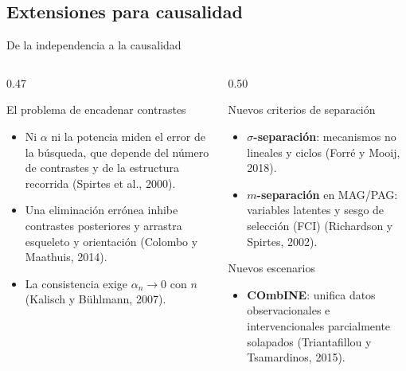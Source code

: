 \documentclass[aspectratio=169,11pt]{beamer}
\newcommand{\srccite}[1]{{\scriptsize\color{upmgray}(#1)}}
\begin{document}
\subsection{Extensiones para causalidad}

\begin{frame}[t]{De la independencia a la causalidad}
  \small
  \begin{columns}[T,onlytextwidth]
    \begin{column}{0.47\textwidth}
      \begin{block}{El problema de encadenar contrastes}
        \begin{itemize}
          \item Ni $\alpha$ ni la potencia miden el error de la búsqueda, que
                depende del número de contrastes y de la estructura recorrida
                \srccite{Spirtes et al., 2000}.
          \item Una eliminación errónea inhibe contrastes posteriores y
                arrastra esqueleto y orientación
                \srccite{Colombo y Maathuis, 2014}.
          \item La consistencia exige $\alpha_n\to 0$ con $n$
                \srccite{Kalisch y Bühlmann, 2007}.
        \end{itemize}
      \end{block}
    \end{column}
    \begin{column}{0.50\textwidth}
      \begin{block}{Nuevos criterios de separación}
        \begin{itemize}
          \item \textbf{$\sigma$-separación}: mecanismos no lineales y ciclos
                \srccite{Forré y Mooij, 2018}.
          \item \textbf{$m$-separación} en MAG/PAG: variables latentes y sesgo
                de selección (FCI) \srccite{Richardson y Spirtes, 2002}.
        \end{itemize}
      \end{block}
      \begin{block}{Nuevos escenarios}
        \begin{itemize}
          \item \textbf{COmbINE}: unifica datos observacionales e
                intervencionales parcialmente solapados
                \srccite{Triantafillou y Tsamardinos, 2015}.
        \end{itemize}
      \end{block}
    \end{column}
  \end{columns}
\end{frame}
\end{document}
